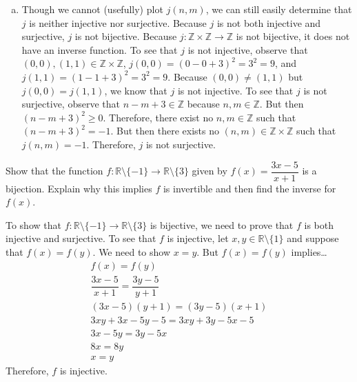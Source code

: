 \documentclass[11pt,letterpaper]{article}
\begin{document}
\begin{enumerate}[(a)]
\item Though we cannot (usefully) plot $j(n, m)$, we can still easily determine that $j$ is neither injective nor surjective. Because $j$ is not both injective and surjective, $j$ is not bijective. Because $j: \mathbb{Z} \times \mathbb{Z} \to \mathbb{Z}$ is not bijective, it does not have an inverse function. To see that $j$ is not injective, observe that $(0, 0), (1, 1) \in \mathbb{Z} \times \mathbb{Z}$, $j(0, 0)= (0 - 0 + 3)^2= 3^2= 9$, and $j(1, 1)= (1 - 1 + 3)^2= 3^2= 9$. Because $(0, 0) \neq (1, 1)$ but $j(0, 0)= j(1, 1)$, we know that $j$ is not injective. To see that $j$ is not surjective, observe that $n - m + 3 \in \mathbb{Z}$ because $n, m \in \mathbb{Z}$. But then $(n - m + 3)^2 \geq 0$. Therefore, there exist no $n, m \in \mathbb{Z}$ such that $(n - m + 3)^2= -1$. But then there exists no $(n, m) \in \mathbb{Z} \times \mathbb{Z}$ such that $j(n, m)= -1$. Therefore, $j$ is not surjective. 
\end{enumerate}



\newpage



 Show that the function $f: \mathbb{R} \setminus \{ -1 \} \to \mathbb{R} \setminus \{ 3 \}$ given by $f(x)= \dfrac{3x - 5}{x + 1}$ is a bijection. Explain why this implies $f$ is invertible and then find the inverse for $f(x)$. \pspace

\sol To show that $f: \mathbb{R} \setminus \{ -1 \} \to \mathbb{R} \setminus \{ 3 \}$ is bijective, we need to prove that $f$ is both injective and surjective. To see that $f$ is injective, let $x, y \in \mathbb{R} \setminus \{ 1 \}$ and suppose that $f(x)= f(y)$. We need to show $x= y$. But $f(x)= f(y)$ implies\dots
	\[
	\begin{gathered}
	f(x)= f(y) \\
	\dfrac{3x - 5}{x + 1}= \dfrac{3y - 5}{y + 1} \\
	(3x - 5)(y + 1)= (3y - 5)(x + 1) \\
	3xy + 3x - 5y - 5= 3xy + 3y - 5x - 5 \\
	3x - 5y= 3y - 5x \\
	8x= 8y \\
	x= y
	\end{gathered}
	\]
Therefore, $f$ is injective. \pspace
\end{document}
